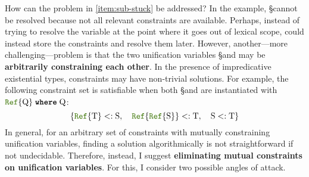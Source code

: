 How can the problem in \ref{item:sub-stuck} be addressed?
In the example, \S cannot be resolved because not all relevant constraints
are available. Perhaps, instead of trying to resolve the variable at the point 
where it goes out of lexical scope, \algo could instead 
store the constraints and resolve them later.
However, another---more challenging---problem is that the two unification
variables \S and \T may be \textbf{arbitrarily constraining each other}. %
In the presence of impredicative existential types, 
constraints may have non-trivial solutions.
For example, the following constraint set is satisfiable when both
\S and \T are instantiated with $\wheret{\reftyp{\Q}}{\Q}$:
\[
  \{ \reftyp{\T} <: \S, \quad \reftyp{\reftyp{\S}} <: \T, \quad \S <: \T \}
\]
In general, for an arbitrary set of constraints with mutually
constraining unification variables, finding a solution algorithmically is
not straightforward if not undecidable.
%
%
Therefore, instead, I suggest \textbf{eliminating mutual constraints on
unification variables}.
For this, I consider two possible angles of attack.
